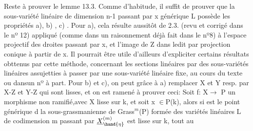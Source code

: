 
Reste à prouver le lemme 13.3.  Comme d'habitude, il suffit de prouver
que  la sous-variété linéaire de dimension n-1  passant par x générique
L\unsure{,}  possède les propriétés  a), b) , c) .  Pour  a),  cela résulte
\hand{[}aussitôt de 2.3. (revu et corrigé dans le nº 12)  appliqué (comme dans un
raisonnement déjà fait dans le nº8) à l'espace projectif  des droites
passant par x, et l'image de Z dans ledit par projection conique à
partir de x. \hand{[}Il pourrait être utile d'ailleurs d'expliciter certains
 résultats obttenus par cette méthode, concernant les sections linéaires
par des sous-variétés linéaires assujetties à passer par une sous-variété
linéaire fixe,  au cours du texte ou dans\hand{/}un nº à part\hand{]}.  Pour  b) et c),
 on peut grâce à a)  remplacer X et Y  resp. par X-Z et Y-Z
qui sont lisses, et on est  ramené à prouver ceci:  Soit f: X$\rightarrow$ P un
morphisme non ramifié,\hand{(}avec X lisse sur k, et soit  x $\in$P(k), alors si
\hand{$\eta$} est le point générique  d  la sous-grassmanienne  de Grass$^{m}$(P)
formée des variétés linéaires L de codimension m passant par  
  $\underline{X}^{(m)}_{\hand{\eta}}$ est  lisse sur k, tout au
